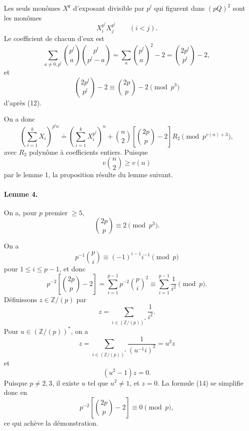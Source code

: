 \documentclass[10pt]{article}
\newcommand{\Z}{\mathbb Z}
\newcommand{\dd}{\mathrel{\doteq}}
\newcommand{\rr}{\mathbf r}
\begin{document}
Les seuls monômes $X^\rr$ d'exposant divisible par $p^l$ qui figurent dans $(pQ)^2$ sont les monômes
\[
X_i^{p^l}X_j^{p^l}\qquad(i<j).
\]
Le coefficient de chacun d'eux est
\[
\sum_{a\ne0,p^l}\binom{p^l}{a}\binom{p^l}{p^l-a}
=
\sum_a \binom{p^l}{a}^2-2
=
\binom{2p^l}{p^l}-2, \tag{13}
\]
et
\[
\binom{2p^l}{p^l}-2
\equiv
\binom{2p}{p}-2
\pmod {p^3}
\]
d'après (12).

On a donc
\[
\left(\sum_{i=1}^k X_i\right)^{p^l n}
\dd
\left(\sum_{i=1}^k X_i^{p^l}\right)^n
+\binom n2\left[\binom{2p}{p}-2\right]R_2
\pmod {p^{v(n)+3}},
\]
avec $R_2$ polynôme à coefficients entiers. Puisque
\[
v\binom n2\ge v(n)
\]
par le lemme 1, la proposition résulte du lemme suivant.

\paragraph{Lemme 4.} On a, pour $p$ premier $\ge5$,
\[
\binom{2p}{p}\equiv2\pmod {p^3}.
\]

On a
\[
p^{-1}\binom pi\equiv(-1)^{i-1}i^{-1}\pmod p
\]
pour $1\le i\le p-1$, et donc
\[
p^{-2}\left[\binom{2p}{p}-2\right]
=
\sum_{i=1}^{p-1}p^{-2}\binom pi^2
\equiv
\sum_{i=1}^{p-1}\frac{1}{i^2}
\pmod p. \tag{14}
\]
Définissons $z\in\Z/(p)$ par
\[
z=\sum_{i\in(\Z/(p))^*}\frac1{i^2}.
\]
Pour $u\in(\Z/(p))^*$, on a
\[
z=\sum_{i\in(\Z/(p))^*}\frac{1}{(u^{-1}i)^2}=u^2z
\]
et
\[
(u^2-1)z=0.
\]
Puisque $p\ne2,3$, il existe $u$ tel que $u^2\ne1$, et $z=0$. La formule (14) se simplifie donc en
\[
p^{-2}\left[\binom{2p}{p}-2\right]\equiv0\pmod p,
\]
ce qui achève la démonstration.
\end{document}
